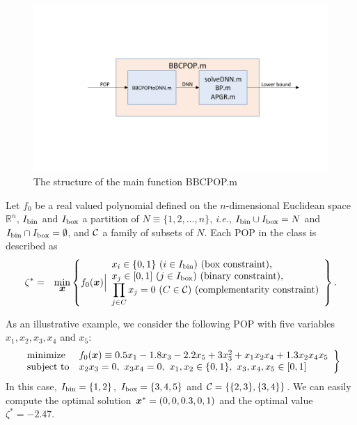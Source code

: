 \documentclass[12pt]{article}
\def\x{\mbox{\boldmath $x$}}
\def\CC{\mbox{$\cal C$}}
\def\Real{\mbox{$\mathbb{R}$}}
\def\Ibinary{\mbox{$I_{\mbox{\scriptsize bin}}$}}
\def\Ibox{\mbox{$I_{\mbox{\scriptsize box}}$}}
\def\Real{\mathbb{R}}
\begin{document}
\begin{figure}[hbt]
\label{fig:structure}
\begin{center}
\includegraphics[width=13cm,height=5.cm]{BBCPOPstructure.pdf} 
\caption{The structure of the main function BBCPOP.m}
\end{center}
\end{figure}

Let $f_0$ be a real valued polynomial  defined on the $n$-dimensional Euclidean space $\Real^n$, 
$\Ibinary$ and $\Ibox$ a partition of $N\equiv\{1,2,\ldots,n\}$, {\it i.e.}, $\Ibinary\cup\Ibox = N$ and 
$\Ibinary\cap\Ibox=\emptyset$, and $\CC$ a family of subsets of $N$. 
Each POP in the class is described as
\begin{eqnarray}
\zeta^* & = & \min_{\x} \left\{ f_0(\x) \Big|
\begin{array}{l}
x_i\in\{0,1\} \ (i\in\Ibinary) \ \mbox{(box constraint)}, \\
x_j\in [0,1] \ (j\in\Ibox) \ \mbox{(binary constraint)}, \\
\displaystyle \prod_{j\in C} x_j = 0 \ (C \in \CC) \ \mbox{(complementarity constraint)} 
\end{array}
 \right\}. \label{eq:POP0} %
\end{eqnarray}

As an illustrative example, we consider the following POP with 
five variables $ x_1,x_2, x_3, x_4$ and $x_5$: 
 \begin{equation}
\left. 
 \begin{array}{ll}
	\mbox{minimize} & f_0(\x) \equiv 0.5x_1 -1.8x_3 -2.2x_5 +3x_3^2 +x_1x_2x_4 + 1.3x_2x_4x_5      \\
	\mbox{subject to} &  x_2x_3 = 0,\  x_3x_4 = 0, \  x_1, x_2 \in \{0,1\}, \  x_3, x_4, x_5 \in [0,1]  
	\end{array}
\right\} 
\label{ex:EX1}
\end{equation}
In this case, $\Ibinary = \{1,2\}$, $\Ibox = \{3,4,5\}$ and $\CC = \left\{ \{2,3\},\{3,4\} \right\}$.  
We can easily compute the optimal solution $\x^*=(0,0,0.3,0,1)$ and the optimal value $\zeta^*=-2.47$. 
\end{document}
